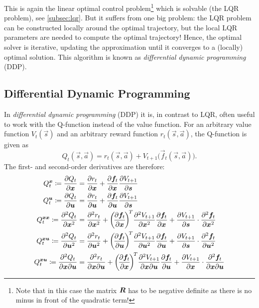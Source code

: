 		This is again the linear optimal control problem\footnote{Note that in this case the matrix \(\bm{R}\) has to be negative definite as there is no minus in front of the quadratic term!} which is solvable (the LQR problem), see \autoref{subsec:lqr}. But it suffers from one big problem: the LQR problem can be constructed locally around the optimal trajectory, but the local LQR parameters are needed to compute the optimal trajectory! Hence, the optimal solver is iterative, updating the approximation until it converges to a (locally) optimal solution. This algorithm is known as \emph{differential dynamic programming} (DDP).

		\subsection{Differential Dynamic Programming}
			In \emph{differential dynamic programming} (DDP) it is, in contrast to LQR, often useful to work with the Q-function instead of the value function. For an arbitrary value function \( V_t(\vec{s}) \) and an arbitrary reward function \( r_t(\vec{s}, \vec{a}) \), the Q-function is given as
			\begin{equation*}
				Q_t(\vec{s}, \vec{a}) = r_t(\vec{s}, \vec{a}) + V_{t + 1}\big(\vec{f}_t(\vec{s}, \vec{a})\big).
			\end{equation*}
			The first- and second-order derivatives are therefore:
			\begin{equation}
				\begin{aligned}
					Q_t^{\vec{x}} \coloneqq \pdv{Q_t}{\vec{x}} &= \pdv{r_t}{\vec{x}} + \pdv{\vec{f}_t}{\vec{x}} \pdv{V_{t + 1}}{\vec{s}} \\
					Q_t^{\vec{u}} \coloneqq \pdv{Q_t}{\vec{u}} &= \pdv{r_t}{\vec{u}} + \pdv{\vec{f}_t}{\vec{u}} \pdv{V_{t + 1}}{\vec{s}} \\
					Q_t^{\vec{x} \vec{x}} \coloneqq \pdv[2]{Q_t}{\vec{x}} &= \pdv[2]{r_t}{\vec{x}} + \bigg(\! \pdv{\vec{f}_t}{\vec{x}} \!\bigg)^{\!T} \pdv[2]{V_{t + 1}}{\vec{x}} \pdv{\vec{f}_t}{\vec{x}} + \pdv{V_{t + 1}}{\vec{s}} \cdot \pdv[2]{\vec{f}_t}{\vec{x}} \\
					Q_t^{\vec{x} \vec{u}} \coloneqq \pdv[2]{Q_t}{\vec{u}} &= \pdv[2]{r_t}{\vec{u}} + \bigg(\! \pdv{\vec{f}_t}{\vec{u}} \!\bigg)^{\!T} \pdv[2]{V_{t + 1}}{\vec{u}} \pdv{\vec{f}_t}{\vec{u}} + \pdv{V_{t + 1}}{\vec{s}} \cdot \pdv[2]{\vec{f}_t}{\vec{u}} \\
					Q_t^{\vec{x} \vec{u}} \coloneqq \pdv{Q_t}{\vec{x}}{\vec{u}} &= \pdv{r_t}{\vec{x}}{\vec{u}} + \bigg(\! \pdv{\vec{f}_t}{\vec{x}} \!\bigg)^{\!T} \pdv{V_{t + 1}}{\vec{x}}{\vec{u}} \pdv{\vec{f}_t}{\vec{u}} + \pdv{V_{t + 1}}{\vec{x}} \cdot \pdv{\vec{f}_t}{\vec{x}}{\vec{u}}
				\end{aligned}  \label{eq:ddpDerivatives}
			\end{equation}
